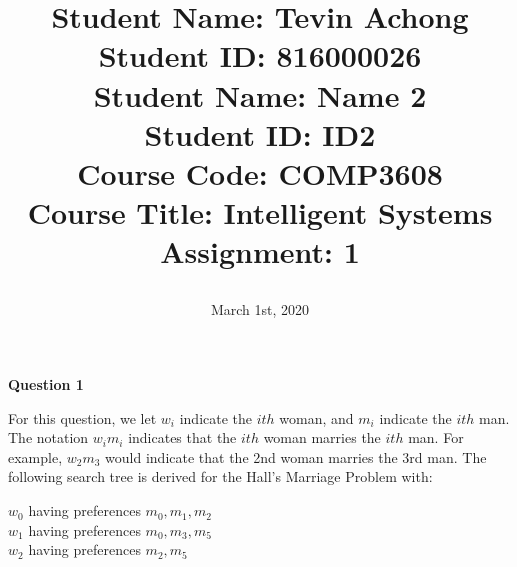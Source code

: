 \documentclass[a4paper, 12pt]{article}
\begin{document}
\title{
		\textbf{Student Name:} Tevin Achong\\
		\textbf{Student ID:} 816000026\\
		\textbf{Student Name:} Name 2\\
		\textbf{Student ID:} ID2\\						
		\textbf{Course Code:} COMP3608\\
		\textbf{Course Title:} Intelligent Systems\\
		\textbf{Assignment:} 1
		\date{March 1st, 2020}
}
\maketitle

\newpage
{}

\begin{center}
	\textbf{Question 1}
\end{center}
For this question, we let $w_i$ indicate the $ith$ woman, and $m_i$ indicate the $ith$ man. The notation $w_im_i$ indicates that the $ith$ woman marries the $ith$ man. For example, $w_2m_3$ would indicate that the 2nd woman marries the 3rd man. The following search tree is derived for the Hall's Marriage Problem with:
\begin{center}
$w_0$ having preferences $m_0, m_1, m_2$\\
$w_1$ having preferences $m_0, m_3, m_5$\\
$w_2$ having preferences $m_2, m_5$
\end{center}


\begin{adjustbox}{width=\linewidth}
\end{adjustbox}
\end{document}
